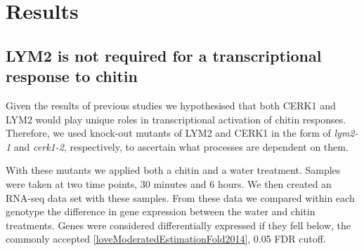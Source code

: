 \documentclass[../main.tex]{subfiles}
\begin{document}
\section{Results}

\subsection{LYM2 is not required for a transcriptional response to chitin}
 

Given the results of previous studies \cite{miyaCERK1LysMReceptor2007,Faulkner2013} we hypothesised that both CERK1 and LYM2 would play unique roles in transcriptional activation of chitin responses. Therefore, we used knock-out mutants of LYM2 and CERK1 in the form of \textit{lym2-1} and \textit{cerk1-2}, respectively, to ascertain what processes are dependent on them.

With these mutants we applied both a chitin and a water treatment. Samples were taken at two time points, 30 minutes and 6 hours. We then created an RNA-seq data set with these samples. From these data we compared within each genotype the difference in gene expression between the water and chitin treatments. Genes were considered differentially expressed if they fell below, the commonly accepted \ref{loveModeratedEstimationFold2014}, 0.05 FDR cutoff.  





\end{document}
